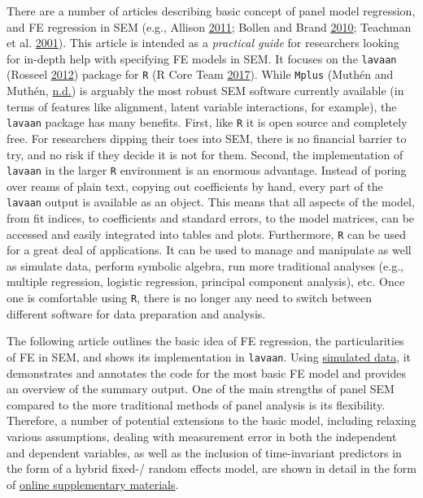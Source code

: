 \documentclass[
  12pt,
  a4paper]{article}
\begin{document}
There are a number of articles describing basic concept of panel model
regression, and FE regression in SEM (e.g., Allison
\protect\hyperlink{ref-Allison2011}{2011}; Bollen and Brand
\protect\hyperlink{ref-Bollen2010}{2010}; Teachman et al.
\protect\hyperlink{ref-Teachman2001}{2001}). This article is intended as
a \textit{practical guide} for researchers looking for in-depth help
with specifying FE models in SEM. It focuses on the \texttt{lavaan}
(Rosseel \protect\hyperlink{ref-R-lavaan}{2012}) package for \texttt{R}
(R Core Team \protect\hyperlink{ref-R-base}{2017}). While \texttt{Mplus}
(Muthén and Muthén, \protect\hyperlink{ref-Mplus}{n.d.}) is arguably the
most robust SEM software currently available (in terms of features like
alignment, latent variable interactions, for example), the
\texttt{lavaan} package has many benefits. First, like \texttt{R} it is
open source and completely free. For researchers dipping their toes into
SEM, there is no financial barrier to try, and no risk if they decide it
is not for them. Second, the implementation of \texttt{lavaan} in the
larger \texttt{R} environment is an enormous advantage. Instead of
poring over reams of plain text, copying out coefficients by hand, every
part of the \texttt{lavaan} output is available as an object. This means
that all aspects of the model, from fit indices, to coefficients and
standard errors, to the model matrices, can be accessed and easily
integrated into tables and plots. Furthermore, \texttt{R} can be used
for a great deal of applications. It can be used to manage and
manipulate as well as simulate data, perform symbolic algebra, run more
traditional analyses (e.g., multiple regression, logistic regression,
principal component analysis), etc. Once one is comfortable using
\texttt{R}, there is no longer any need to switch between different
software for data preparation and analysis.

The following article outlines the basic idea of FE regression, the
particularities of FE in SEM, and shows its implementation in
\texttt{lavaan}. Using
\href{https://github.com/henrik-andersen/FE-SEM/blob/master/simulation-code.R}{simulated
data}, it demonstrates and annotates the code for the most basic FE
model and provides an overview of the summary output. One of the main
strengths of panel SEM compared to the more traditional methods of panel
analysis is its flexibility. Therefore, a number of potential extensions
to the basic model, including relaxing various assumptions, dealing with
measurement error in both the independent and dependent variables, as
well as the inclusion of time-invariant predictors in the form of a
hybrid fixed-/ random effects model, are shown in detail in the form of
\href{https://github.com/henrik-andersen/FE-SEM/blob/master/extensions.pdf}{online
supplementary materials}.
\end{document}
